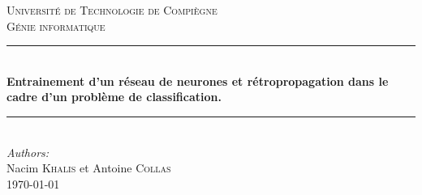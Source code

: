 \documentclass[a4paper,11pt,oneside,roman]{article}
\begin{document}
    
    \begin{titlepage}
    
        \newcommand{\HRule}{\rule{\linewidth}{0.5mm}} %
        
        \center %
         
        
        \textsc{\LARGE Université de Technologie de Compiègne}\\[0.5cm] %
        \textsc{\Large Génie informatique}\\[1.5cm] %
        
        
        \HRule \\[0.4cm]
        { \huge \bfseries Entrainement d'un réseau de neurones et rétropropagation dans le cadre d'un problème de classification.}\\[0.4cm] %
        \HRule \\[1.5cm]
         
        
        \Large \emph{Authors:}\\
        Nacim \textsc{Khalis} et Antoine \textsc{Collas}\\[3cm] %
        
        
        {\large \AdvanceDate[-4]\today}\\[4cm] %
        

\end{titlepage}
\end{document}
